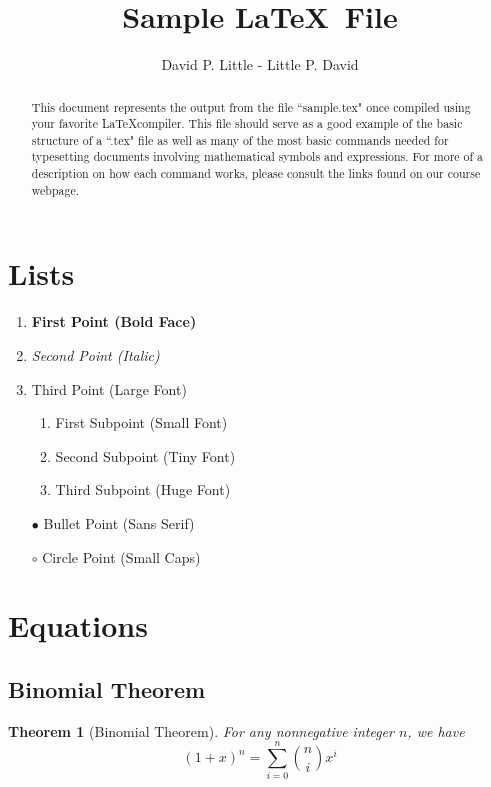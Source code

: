 \documentclass[]{article}
\newtheorem{theorem}{Theorem}
\begin{document}
\title{Sample \LaTeX ~File}
\author{David P. Little - Little P. David}
\maketitle

\begin{abstract}
This document represents the output from the file ``sample.tex" once compiled using your favorite \LaTeX compiler.  This file should serve as a good example of the basic structure of a ``.tex" file as well as many of the most basic commands needed for typesetting documents involving mathematical symbols and expressions.  For more of a description on how each command works, please consult the links found on our course webpage.
\end{abstract}

\section{Lists}
\begin{enumerate}
\item {\bf First Point (Bold Face)}
\item {\em Second Point (Italic)}
\item {\Large Third Point (Large Font)}
    \begin{enumerate}
        \item {\small First Subpoint (Small Font)} 
        \item {\tiny Second Subpoint (Tiny Font)} 
        \item {\Huge Third Subpoint (Huge Font)} 
    \end{enumerate}
\item[$\bullet$] {\sf Bullet Point (Sans Serif)}
\item[$\circ$] {\sc Circle Point (Small Caps)} 
\end{enumerate}


\section{Equations}

\subsection{Binomial Theorem}
\begin{theorem}[Binomial Theorem]
For any nonnegative integer $n$, we have
$$(1+x)^n = \sum_{i=0}^n {n \choose i} x^i$$
\end{theorem}
\end{document}
